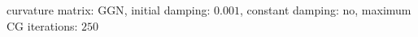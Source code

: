 curvature matrix: $\text{GGN}$, initial damping: $\num[scientific-notation=true]{0.001}$, constant damping: $\text{no}$, maximum CG iterations: $\num[scientific-notation=false]{250}$
